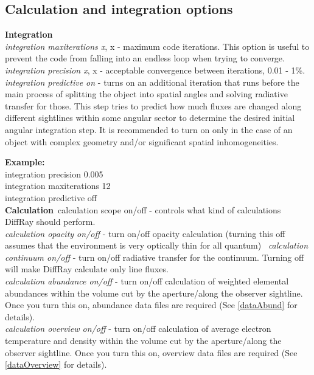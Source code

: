 \documentclass[a4paper]{article}
\begin{document}
\subsection{Calculation and integration options}
{\bf Integration}\\
    {\it integration maxiterations x}, x - maximum code iterations.
This option is useful to prevent the code from falling into an endless loop when trying to converge.\\
    {\it integration precision x}, x - acceptable convergence between iterations, 0.01 - 1\%. \\
    {\it integration predictive on} - turns on an additional iteration that runs before the main process of splitting the object into spatial angles and solving
radiative transfer for those.
This step tries to predict how much fluxes are changed along different sightlines within some angular sector
to determine the desired initial angular integration step.
It is recommended to turn on only in the case of an object with complex geometry and/or
significant spatial inhomogeneities.

{\bf Example:}\\
integration precision 0.005\\
integration maxiterations 12\\
integration predictive off\\

{\bf Calculation}\
calculation {scope} on/off - controls what kind of calculations DiffRay should perform. \\
    {\it calculation opacity on/off} - turn on/off opacity calculation (turning this off assumes that the environment is very optically thin for all
quantum) \
    {\it calculation continuum on/off} - turn on/off radiative transfer for the continuum. Turning off will make DiffRay calculate only line fluxes. \\
    {\it calculation abundance on/off} - turn on/off calculation of weighted elemental abundances within the volume cut by the aperture/along the observer sightline. Once you turn this on,
abundance data files are required (See \ref{dataAbund} for details). \\
    {\it calculation overview on/off} - turn on/off calculation of average electron temperature and density within the volume cut by the aperture/along the observer sightline. Once you turn this on,
overview data files are required (See \ref{dataOverview} for details). \\
\end{document}
